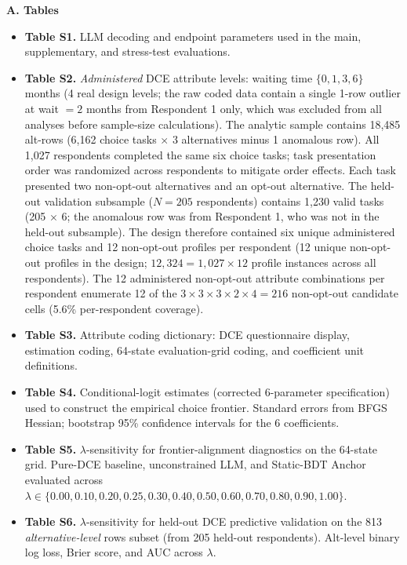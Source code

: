 \documentclass[11pt]{article}
\begin{document}
\textbf{A. Tables}
\begin{itemize}\setlength{\itemsep}{0pt}
\item \textbf{Table S1.} LLM decoding and endpoint parameters used in the main, supplementary, and stress-test evaluations.
\item \textbf{Table S2.} \emph{Administered} DCE attribute levels: waiting time $\{0, 1, 3, 6\}$ months (4 real design levels; the raw coded data contain a single 1-row outlier at wait $= 2$ months from Respondent 1 only, which was excluded from all analyses before sample-size calculations). The analytic sample contains 18,485 alt-rows (6,162 choice tasks $\times$ 3 alternatives minus 1 anomalous row). All 1,027 respondents completed the same six choice tasks; task presentation order was randomized across respondents to mitigate order effects. Each task presented two non-opt-out alternatives and an opt-out alternative. The held-out validation subsample ($N=205$ respondents) contains 1,230 valid tasks (205 $\times$ 6; the anomalous row was from Respondent 1, who was not in the held-out subsample). The design therefore contained six unique administered choice tasks and 12 non-opt-out profiles per respondent (12 unique non-opt-out profiles in the design; $12{,}324 = 1{,}027 \times 12$ profile instances across all respondents). The 12 administered non-opt-out attribute combinations per respondent enumerate 12 of the $3 \times 3 \times 3 \times 2 \times 4 = 216$ non-opt-out candidate cells (5.6\% per-respondent coverage).
\item \textbf{Table S3.} Attribute coding dictionary: DCE questionnaire display, estimation coding, 64-state evaluation-grid coding, and coefficient unit definitions.
\item \textbf{Table S4.} Conditional-logit estimates (corrected 6-parameter specification) used to construct the empirical choice frontier. Standard errors from BFGS Hessian; bootstrap 95\% confidence intervals for the 6 coefficients.
\item \textbf{Table S5.} $\lambda$-sensitivity for frontier-alignment diagnostics on the 64-state grid. Pure-DCE baseline, unconstrained LLM, and Static-BDT Anchor evaluated across $\lambda \in \{0.00, 0.10, 0.20, 0.25, 0.30, 0.40, 0.50, 0.60, 0.70, 0.80, 0.90, 1.00\}$.
\item \textbf{Table S6.} $\lambda$-sensitivity for held-out DCE predictive validation on the 813 \emph{alternative-level} rows subset (from 205 held-out respondents). Alt-level binary log loss, Brier score, and AUC across $\lambda$.

\end{itemize}
\end{document}
